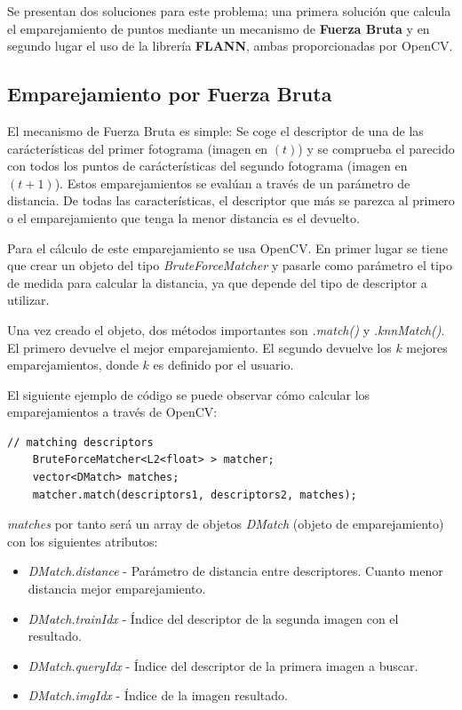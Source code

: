 Se presentan dos soluciones para este problema; una primera solución que calcula el emparejamiento de puntos mediante un mecanismo de \textbf{Fuerza Bruta} y en segundo lugar el uso de la librería \textbf{FLANN}, ambas proporcionadas por OpenCV.

\subsection{Emparejamiento por Fuerza Bruta}

El mecanismo de Fuerza Bruta es simple: Se coge el descriptor de una de las carácterísticas del primer fotograma (imagen en $(t)$) y se comprueba el parecido con todos los puntos de carácterísticas del segundo fotograma (imagen en $(t+1)$). Estos emparejamientos se evalúan a través de un parámetro de distancia. De todas las características, el descriptor que más se parezca al primero o el emparejamiento que tenga la menor distancia es el devuelto.

Para el cálculo de este emparejamiento se usa OpenCV. En primer lugar se tiene que crear un objeto del tipo \textit{BruteForceMatcher} y pasarle como parámetro el tipo de medida para calcular la distancia, ya que depende del tipo de descriptor a utilizar.

Una vez creado el objeto, dos métodos importantes son \textit{.match()} y \textit{.knnMatch()}. El primero devuelve el mejor emparejamiento. El segundo devuelve los $k$ mejores emparejamientos, donde $k$ es definido por el usuario.


El siguiente ejemplo de código se puede observar cómo calcular los emparejamientos a través de OpenCV:

\begin{lstlisting}[style=CStyle]
	// matching descriptors
	BruteForceMatcher<L2<float> > matcher;
	vector<DMatch> matches;
	matcher.match(descriptors1, descriptors2, matches);
\end{lstlisting}

\textit{matches} por tanto será un array de objetos \textit{DMatch} (objeto de emparejamiento) con los siguientes atributos:

\begin{itemize}
\item \textit{DMatch.distance} - Parámetro de distancia entre descriptores. Cuanto menor distancia mejor emparejamiento.

\item \textit{DMatch.trainIdx} - Índice del descriptor de la segunda imagen con el resultado.

\item \textit{DMatch.queryIdx} - Índice del descriptor de la primera imagen a buscar.

\item \textit{DMatch.imgIdx} - Índice de la imagen resultado.
\end{itemize}

